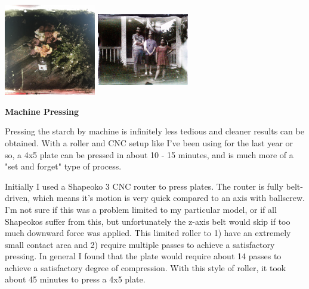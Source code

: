 \documentclass[11pt]{article}
\begin{document}
\begin{center}
\includegraphics[width=4cm, height=4cm]{img/part1_30.jpg}
\includegraphics[width=4cm, height=4cm]{img/part1_31.jpg}
\end{center}


\textbf{Machine Pressing}\newline

Pressing the starch by machine is infinitely less tedious and cleaner results can be obtained. With a roller and CNC setup like I've been using for the last year or so, a 4x5 plate can be pressed in about 10 - 15 minutes, and is much more of a "set and forget" type of process.\newline

Initially I used a Shapeoko 3 CNC router to press plates. The router is fully belt-driven, which means it's motion is very quick compared to an axis with ballscrew. I'm not sure if this was a problem limited to my particular model, or if all Shapeokos suffer from this, but unfortunately the z-axis belt would skip if too much downward force was applied. This limited roller to 1) have an extremely small contact area and 2) require multiple passes to achieve a satisfactory pressing. In general I found that the plate would require about 14 passes to achieve a satisfactory degree of compression. With this style of roller, it took about 45 minutes to press a 4x5 plate.\newline
\end{document}
